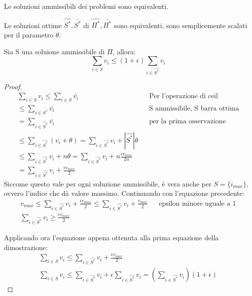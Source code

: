\begin{remark}
    Le soluzioni ammissibili dei problemi sono equivalenti.
\end{remark}

\begin{lemma}
    Le soluzioni ottime $\hat{S^*}, \bar{S^*}$ di $\hat{\Pi^*}, \bar{\Pi^*}$ sono equivalenti, 
    sono semplicemente scalati per il parametro $\theta$.
\end{lemma}

\begin{lemma}
    \label{knl2}
    Sia S una soluione ammissibile di $\Pi$, allora:
    $$\sum_{i \in S} v_i \leq (1 + \epsilon) \sum_{i \in \hat{S^*}} v_i$$
\end{lemma}
\begin{proof}
    \begin{equation}
        \begin{aligned}
            \sum_{i \in S} v_i \leq \sum_{i \in S} \bar{v_i} && \text{Per l'operazione di ceil}\\
            \leq \sum_{i \in \bar{S^*}} \bar{v_i} && \text{S ammissibile, S barra ottima}\\
            = \sum_{i \in \hat{S^*}} \bar{v_i} && \text{per la prima osservazione}\\
            \leq \sum_{i \in \hat{S^*}} (v_i + \theta) = \sum_{i \in \hat{S^*}} v_i + |\hat{S^*}|\theta\\
            \leq \sum_{i \in \hat{S^*}} v_i + n \theta = \sum_{i \in \hat{S^*}} v_i + n\frac{\epsilon v_{max}}{2n}\\
            = \sum_{i \in \hat{S^*}} v_i + \frac{\epsilon v_{max}}{2} 
        \end{aligned}
    \end{equation}
    Siccome questo vale per ogni soluzione ammissibile, è vera anche per $S = \{i_{max}\}$, ovvero l'indice
    che dà valore massimo. Continuando con l'equazione precedente:
    \begin{equation}
        \begin{aligned}
            v_{max} \leq \sum_{i \in \hat{S^*}} v_i + \frac{\epsilon v_{max}}{2} \leq \sum_{i \in \hat{S^*}} v_i + \frac{ v_{max}}{2} &&\text{epsilon minore uguale a 1}\\
            \sum_{i \in \hat{S^*}} v_i \geq \frac{\epsilon v_{max}}{2}
        \end{aligned}
    \end{equation}

    Applicando ora l'equazione appena ottenuta alla prima equazione della dimostrazione:
    \begin{equation}
        \begin{aligned}
            \sum_{i \in S} v_i \leq \sum_{i \in \hat{S^*}} v_i + \frac{\epsilon v_{max}}{2}\\
            \sum_{i \in S} v_i \leq \sum_{i \in \hat{S^*}} v_i + \epsilon \sum_{i \in \hat{S^*}} v_i = (\sum_{i \in \hat{S^*}} v_i)(1+\epsilon)
        \end{aligned}
    \end{equation}
\end{proof}
